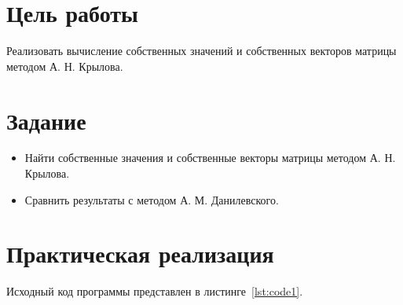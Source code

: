 \documentclass[a4paper, 14pt]{extarticle}
\begin{document}
\renewcommand{\ttdefault}{pcr}

\setlength{\tabcolsep}{3pt}
\newpage
\setcounter{page}{2}

\section{Цель работы}\label{Sect::goal}

Реализовать вычисление собственных значений и собственных
векторов матрицы методом А. Н. Крылова.

\section{Задание}\label{Sect::task}

\begin{itemize}
    \item Найти собственные значения и собственные векторы матрицы методом А. Н. Крылова.
    \item Сравнить результаты с методом А. М. Данилевского.
\end{itemize}

\section{Практическая реализация}\label{Sect::code}

Исходный код программы представлен в листинге~\ref{lst:code1}.
\end{document}
